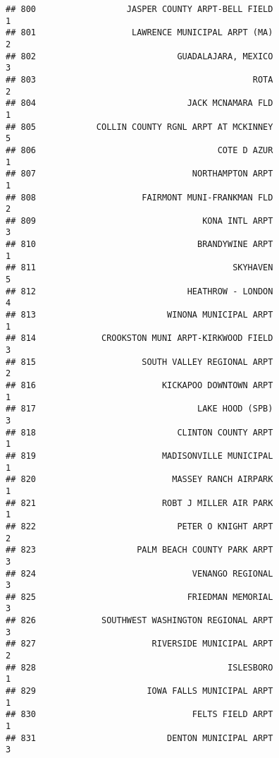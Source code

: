 \documentclass[
]{article}
\begin{document}
\begin{verbatim}
## 800                  JASPER COUNTY ARPT-BELL FIELD                           1
## 801                   LAWRENCE MUNICIPAL ARPT (MA)                           2
## 802                            GUADALAJARA, MEXICO                           3
## 803                                           ROTA                           2
## 804                              JACK MCNAMARA FLD                           1
## 805            COLLIN COUNTY RGNL ARPT AT MCKINNEY                           5
## 806                                    COTE D AZUR                           1
## 807                               NORTHAMPTON ARPT                           1
## 808                     FAIRMONT MUNI-FRANKMAN FLD                           2
## 809                                 KONA INTL ARPT                           3
## 810                                BRANDYWINE ARPT                           1
## 811                                       SKYHAVEN                           5
## 812                              HEATHROW - LONDON                           4
## 813                          WINONA MUNICIPAL ARPT                           1
## 814             CROOKSTON MUNI ARPT-KIRKWOOD FIELD                           3
## 815                     SOUTH VALLEY REGIONAL ARPT                           2
## 816                         KICKAPOO DOWNTOWN ARPT                           1
## 817                                LAKE HOOD (SPB)                           3
## 818                            CLINTON COUNTY ARPT                           1
## 819                         MADISONVILLE MUNICIPAL                           1
## 820                           MASSEY RANCH AIRPARK                           1
## 821                         ROBT J MILLER AIR PARK                           1
## 822                            PETER O KNIGHT ARPT                           2
## 823                    PALM BEACH COUNTY PARK ARPT                           3
## 824                               VENANGO REGIONAL                           3
## 825                              FRIEDMAN MEMORIAL                           3
## 826             SOUTHWEST WASHINGTON REGIONAL ARPT                           3
## 827                       RIVERSIDE MUNICIPAL ARPT                           2
## 828                                      ISLESBORO                           1
## 829                      IOWA FALLS MUNICIPAL ARPT                           1
## 830                               FELTS FIELD ARPT                           1
## 831                          DENTON MUNICIPAL ARPT                           3

\end{verbatim}
\end{document}
